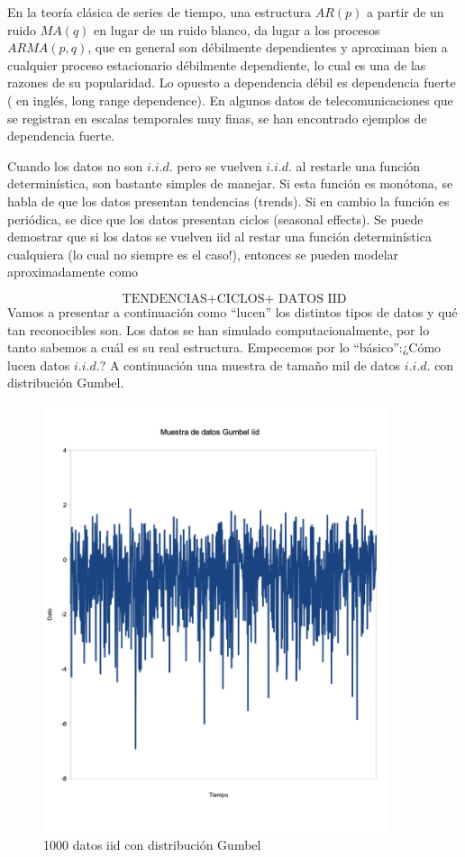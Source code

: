 \documentclass[
  oneside]{book}
\begin{document}
En la teoría clásica de series de tiempo, una estructura \(AR(p)\) a
partir de un ruido \(MA(q)\) en lugar de un ruido blanco, da lugar a los
procesos \(ARMA (p,q)\), que en general son débilmente dependientes y
aproximan bien a cualquier proceso estacionario débilmente dependiente,
lo cual es una de las razones de su popularidad. Lo opuesto a
dependencia débil es dependencia fuerte ( en inglés, long range
dependence). En algunos datos de telecomunicaciones que se registran en
escalas temporales muy finas, se han encontrado ejemplos de dependencia
fuerte.

Cuando los datos no son \(i.i.d.\) pero se vuelven \(i.i.d.\) al
restarle una función determinística, son bastante simples de manejar. Si
esta función es monótona, se habla de que los datos presentan tendencias
(trends). Si en cambio la función es periódica, se dice que los datos
presentan ciclos (seasonal effects). Se puede demostrar que si los datos
se vuelven iid al restar una función determinística cualquiera (lo cual
no siempre es el caso!), entonces se pueden modelar aproximadamente como

\[
\text{TENDENCIAS+CICLOS+ DATOS IID}
\] Vamos a presentar a continuación como ``lucen'' los distintos tipos
de datos y qué tan reconocibles son. Los datos se han simulado
computacionalmente, por lo tanto sabemos a cuál es su real estructura.
Empecemos por lo ``básico'':¿Cómo lucen datos \(i.i.d.\)? A continuación
una muestra de tamaño mil de datos \(i.i.d.\) con distribución Gumbel.

\begin{figure}
\centering
\includegraphics[width=0.9\textwidth,height=\textheight]{images/p1.png}
\caption{1000 datos iid con distribución Gumbel}
\end{figure}
\end{document}
